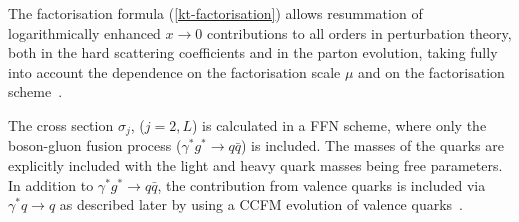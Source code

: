 The factorisation formula (\ref{kt-factorisation})  
allows resummation of logarithmically enhanced $ x \to 0 $ contributions  
to all orders in perturbation theory,  
both in the  hard scattering coefficients and 
in the parton evolution, taking fully into account the 
dependence on the factorisation scale $\mu$ and on the 
factorisation scheme~\cite{Catani:1994sq,Catani:1993rn}.  
 
The cross section $\sigma_j$, ($j= 2, L$) is calculated in a FFN scheme, where
only the boson-gluon fusion process ($\gamma^* g^* \to q \bar{q}$) is included. The masses of the 
quarks are explicitly included with the light and heavy quark masses being free parameters.
In addition to $\gamma^* g^* \to q\bar{q}$,  the contribution from valence quarks is included 
via $\gamma^* q \to q$ as described later by using a CCFM evolution of 
valence quarks~\cite{Deak:2010gk,Hautmann:2013tba}. 

